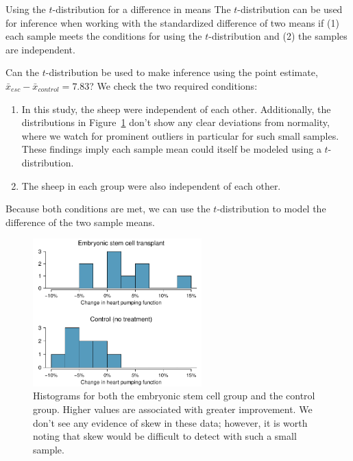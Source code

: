 \begin{onebox}{Using the $t$-distribution for a difference in means}
\label{ConditionsForTwoSampleTDist}The $t$-distribution can be used for inference when working with the standardized difference of two means if (1) each sample meets the conditions for using the $t$-distribution and (2) the samples are independent.
\end{onebox}

\begin{examplewrap}
\begin{nexample}{Can the $t$-distribution be used to make inference using the point estimate, $\bar{x}_{esc} - \bar{x}_{control} = 7.83$?}
We check the two required conditions:
\begin{enumerate}
\item In this study, the sheep were independent of each other. Additionally, the distributions in Figure~\ref{stemCellTherapyForHearts} don't show any clear deviations from normality, where we watch for prominent outliers in particular for such small samples. These findings imply each sample mean could itself be modeled using a $t$-distribution.
\item The sheep in each group were also independent of each other.
\end{enumerate}
Because both conditions are met, we can use the $t$-distribution to model the difference of the two sample means.
\end{nexample}
\end{examplewrap}

\begin{figure}[h]
\centering
\includegraphics[width=0.58\textwidth]{ch_inference_for_means/figures/stemCellTherapyForHearts/stemCellTherapyForHearts}
\caption{Histograms for both the embryonic stem cell group and the control group. Higher values are associated with greater improvement. We don't see any evidence of skew in these data; however, it is worth noting that skew would be difficult to detect with such a small sample.}
\label{stemCellTherapyForHearts}
\end{figure}

